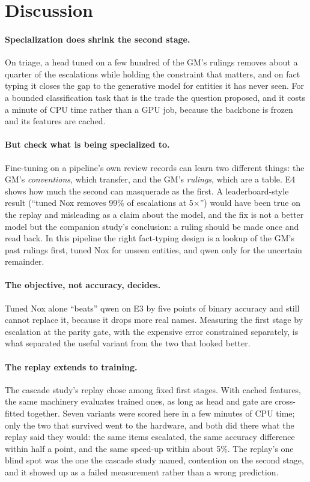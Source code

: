 \documentclass[11pt]{article}
\begin{document}
\section{Discussion}

\paragraph{Specialization does shrink the second stage.} On triage, a head tuned on a few hundred of
the GM's rulings removes about a quarter of the escalations while holding the constraint that
matters, and on fact typing it closes the gap to the generative model for entities it has never
seen. For a bounded classification task that is the trade the question proposed, and it costs a
minute of CPU time rather than a GPU job, because the backbone is frozen and its features are cached.

\paragraph{But check what is being specialized to.} Fine-tuning on a pipeline's own review records
can learn two different things: the GM's \emph{conventions}, which transfer, and the GM's
\emph{rulings}, which are a table. E4 shows how much the second can masquerade as the first. A
leaderboard-style result (``tuned Nox removes 99\% of escalations at 5$\times$'') would have been
true on the replay and misleading as a claim about the model, and the fix is not a better model but
the companion study's conclusion: a ruling should be made once and read back. In this pipeline the
right fact-typing design is a lookup of the GM's past rulings first, tuned Nox for unseen entities,
and qwen only for the uncertain remainder.

\paragraph{The objective, not accuracy, decides.} Tuned Nox alone ``beats'' qwen on E3 by five points
of binary accuracy and still cannot replace it, because it drops more real names. Measuring the
first stage by escalation at the parity gate, with the expensive error constrained separately, is
what separated the useful variant from the two that looked better.

\paragraph{The replay extends to training.} The cascade study's replay chose among fixed first stages.
With cached features, the same machinery evaluates trained ones, as long as head and gate are
cross-fitted together. Seven variants were scored here in a few minutes of CPU time; only the two
that survived went to the hardware, and both did there what the replay said they would: the same
items escalated, the same accuracy difference within half a point, and the same speed-up within about
5\%. The replay's one blind spot was the one the cascade study named, contention on the second
stage, and it showed up as a failed measurement rather than a wrong prediction.
\end{document}
